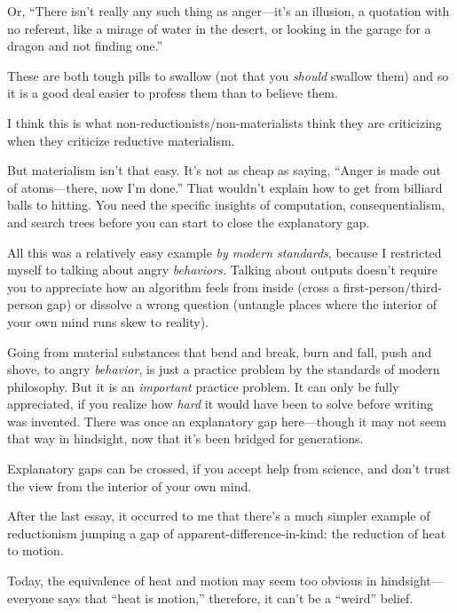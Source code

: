 {
 Or, ``There isn't really any such
thing as anger---it's an illusion, a quotation with no
referent, like a mirage of water in the desert, or looking in the
garage for a dragon and not finding one.''}

{
 These are both tough pills to swallow (not that you
\textit{should} swallow them) and so it is a good deal easier to
profess them than to believe them.}

{
 I think this is what non-reductionists/non-materialists think they
are criticizing when they criticize reductive materialism.}

{
 But materialism isn't that easy.
It's not as cheap as saying, ``Anger
is made out of atoms---there, now I'm
done.'' That wouldn't explain how to
get from billiard balls to hitting. You need the specific insights of
computation, consequentialism, and search trees before you can start to
close the explanatory gap.}

{
 All this was a relatively easy example \textit{by modern
standards}, because I restricted myself to talking about angry
\textit{behaviors.} Talking about outputs doesn't
require you to appreciate how an algorithm feels from inside (cross a
first-person/third-person gap) or dissolve a wrong question (untangle
places where the interior of your own mind runs skew to reality).}

{
 Going from material substances that bend and break, burn and fall,
push and shove, to angry \textit{behavior}, is just a practice problem
by the standards of modern philosophy. But it is an \textit{important}
practice problem. It can only be fully appreciated, if you realize how
\textit{hard} it would have been to solve before writing was invented.
There was once an explanatory gap here---though it may not seem that
way in hindsight, now that it's been bridged for
generations.}

{
 Explanatory gaps can be crossed, if you accept help from science,
and don't trust the view from the interior of your own
mind.}

\myendsectiontext


{
 After the last essay, it occurred to me that
there's a much simpler example of reductionism jumping
a gap of apparent-difference-in-kind: the reduction of heat to motion.
}

{
 Today, the equivalence of heat and motion may seem too obvious in
hindsight---everyone says that ``heat is
motion,'' therefore, it can't be a
``weird'' belief.}

